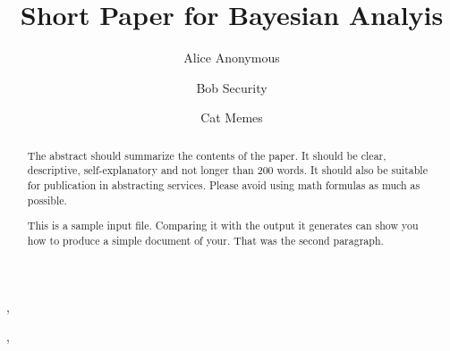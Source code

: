 \documentclass[ba]{imsart}
\numberwithin{equation}{section}
\theoremstyle{plain}
\begin{document}
\begin{frontmatter}

\title{Short Paper for Bayesian Analyis}

\begin{aug}
\author{Alice Anonymous}, \author{Bob Security}, \author{Cat Memes}

\address[addr1]{Some Institute of Technology, Department, Street, City, State, Zip \ifstrequal{addr1}{addr1}{}{}
\ifstrequal{addr1}{addr1}{}{}
 \ifstrequal{addr1}{addr1}{}{}
 \ifstrequal{addr1}{addr2}{\printead{ea-3}}{}
} %
\address[addr2]{Another University, Department, Street, City, State, Zip \ifstrequal{addr2}{addr1}{\printead{ea-1}}{}
\ifstrequal{addr2}{addr1}{\printead{ua-1}}{}
 \ifstrequal{addr2}{addr1}{\printead{ea-2}}{}
 \ifstrequal{addr2}{addr2}{}{}
}%


\end{aug}

\begin{abstract}
The abstract should summarize the contents of the paper. It should be clear, descriptive, self-explanatory and not longer than 200 words. It should also be suitable for publication in abstracting services. Please avoid using math formulas as much as possible.

This is a sample input file. Comparing it with the output it generates can show you how to produce a simple document of your. That was the second paragraph.
\end{abstract}

 \begin{keyword}[class=MSC]
\end{keyword}
 \begin{keyword}  \end{keyword}
\end{frontmatter}
\end{document}

